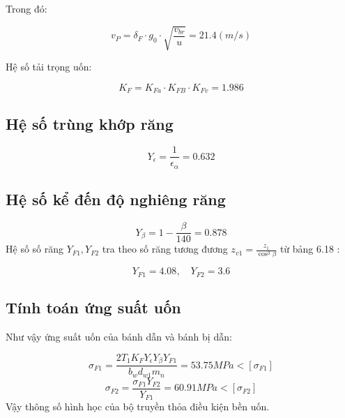 Trong đó:

\begin{equation}
v_P = \delta_F \cdot g_0 \cdot \sqrt{\frac{v_{br}}{u}} = 21.4(m/s)
\end{equation}

Hệ số tải trọng uốn:

\begin{equation}
K_F = K_{Fa} \cdot K_{FB} \cdot K_{Fv} = 1.986
\end{equation}

\subsection{Hệ số trùng khớp răng}

\begin{equation}
Y_\epsilon = \frac{1}{\epsilon_\alpha} = 0.632
\end{equation}

\subsection{Hệ số kể đến độ nghiêng răng}

\begin{equation}
Y_\beta = 1 - \frac{\beta}{140} = 0.878
\end{equation}
Hệ số số răng $Y_{F1}, Y_{F2}$ tra theo số răng tương đương $z_{v1} = \frac{z_1}{\cos^3 \beta}$ từ bảng 6.18 \cite{reference}:

\begin{equation}
Y_{F1} = 4.08, \quad Y_{F2} = 3.6
\end{equation}

\subsection{Tính toán ứng suất uốn}

Như vậy ứng suất uốn của bánh dẫn và bánh bị dẫn:

\begin{equation}
\sigma_{F1} = \frac{2T_1 K_F Y_\epsilon Y_\beta Y_{F1}}{b_w d_{w1} m_n} = 53.75 MPa < [\sigma_{F1}]
\end{equation}
\begin{equation}
\sigma_{F2} = \frac{\sigma_{F1} Y_{F2}}{Y_{F1}} = 60.91 MPa < [\sigma_{F2}]
\end{equation}
Vậy thông số hình học của bộ truyền thỏa điều kiện bền uốn.
